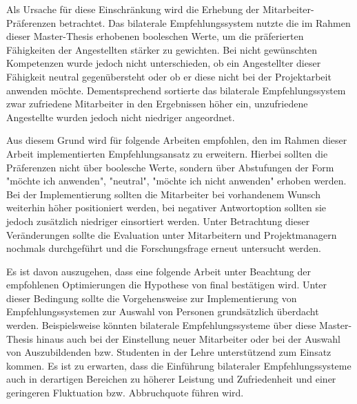 Als Ursache für diese Einschränkung wird die Erhebung der Mitarbeiter-Präferenzen betrachtet. Das bilaterale Empfehlungssystem nutzte die im Rahmen dieser Master-Thesis erhobenen booleschen Werte, um die präferierten Fähigkeiten der Angestellten stärker zu gewichten. Bei nicht gewünschten Kompetenzen wurde jedoch nicht unterschieden, ob ein Angestellter dieser Fähigkeit neutral gegenübersteht oder ob er diese nicht bei der Projektarbeit anwenden möchte. Dementsprechend sortierte das bilaterale Empfehlungssystem zwar zufriedene Mitarbeiter in den Ergebnissen höher ein, unzufriedene Angestellte wurden jedoch nicht niedriger angeordnet.

Aus diesem Grund wird für folgende Arbeiten empfohlen, den im Rahmen dieser Arbeit implementierten Empfehlungsansatz zu erweitern. Hierbei sollten die Präferenzen nicht über boolesche Werte, sondern über Abstufungen der Form "möchte ich anwenden", "neutral", "möchte ich nicht anwenden" erhoben werden. Bei der Implementierung sollten die Mitarbeiter bei vorhandenem Wunsch weiterhin höher positioniert werden, bei negativer Antwortoption sollten sie jedoch zusätzlich niedriger einsortiert werden. Unter Betrachtung dieser Veränderungen sollte die Evaluation unter Mitarbeitern und Projektmanagern nochmals durchgeführt und die Forschungsfrage erneut untersucht werden.

Es ist davon auszugehen, dass eine folgende Arbeit unter Beachtung der empfohlenen Optimierungen die Hypothese von \textcite[S. 1ff.]{malinowski:2006} final bestätigen wird. Unter dieser Bedingung sollte die Vorgehensweise zur Implementierung von Empfehlungssystemen zur Auswahl von Personen grundsätzlich überdacht werden. Beispielsweise könnten bilaterale Empfehlungssysteme über diese Master-Thesis hinaus auch bei der Einstellung neuer Mitarbeiter oder bei der Auswahl von Auszubildenden bzw. Studenten in der Lehre unterstützend zum Einsatz kommen. Es ist zu erwarten, dass die Einführung bilateraler Empfehlungssysteme auch in derartigen Bereichen zu höherer Leistung und Zufriedenheit und einer geringeren Fluktuation bzw. Abbruchquote führen wird.
